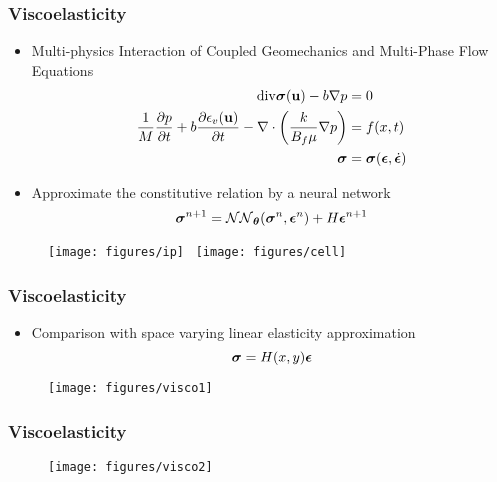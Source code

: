 \documentclass[usenames,dvipsnames]{beamer}
\newcommand{\bt}[0]{\bm{\theta}}
\newcommand{\bu}{\mathbf{u}}
\begin{document}
\begin{frame}

	\frametitle{Viscoelasticity}
	\begin{itemize}
		\item Multi-physics Interaction of Coupled Geomechanics and Multi-Phase Flow Equations 
		{\small
			\begin{align*}
			\mathrm{div}\bsigma(\bu) - b \nabla p &= 0\\
			\frac{1}{M} \frac{\partial p}{\partial t} + b\frac{\partial \epsilon_v(\bu)}{\partial t} - \nabla\cdot\left(\frac{k}{B_f\mu}\nabla p\right) &= f(x,t)	\\
			\bsigma &= \bsigma(\bepsilon, \dot\bepsilon)
			\end{align*}
		}
		\item Approximate the constitutive relation by a neural network
		{\small
			$$\bsigma^{n+1} = \mathcal{NN}_{\bt} (\bsigma^n, \bepsilon^n) + H\bepsilon^{n+1}$$}
	\end{itemize}		
	\begin{figure}[hbt]	
		\centering
		\texttt{[image: figures/ip]}~
		\texttt{[image: figures/cell]}
	\end{figure}
	
\end{frame}


\begin{frame}
	\frametitle{Viscoelasticity}
	
	\begin{itemize}
		\item Comparison with space varying linear elasticity approximation
		\begin{equation*}
		\bm{\sigma} = H(x, y) \bm{\epsilon}
		\end{equation*}
	\end{itemize}
	\begin{figure}[hbt]
		\texttt{[image: figures/visco1]}
	\end{figure}
	
\end{frame}

\begin{frame}
	\frametitle{Viscoelasticity}
	\begin{figure}[hbt]
		\texttt{[image: figures/visco2]}
	\end{figure}
	
\end{frame}
\end{document}
